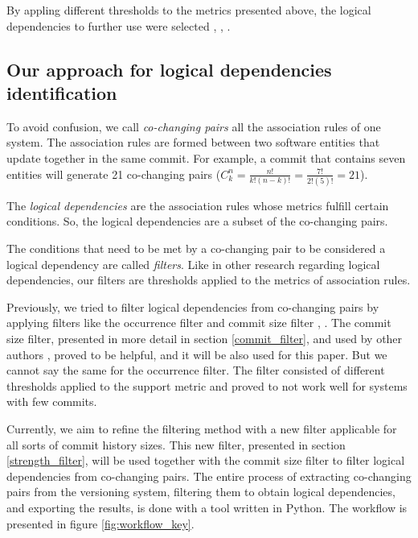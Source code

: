 \documentclass[runningheads]{comsis2}
\newcommand*{\Comb}[2]{{}C^{#1}_{#2}}%
\begin{document}
By appling different thresholds to the metrics presented above, the logical dependencies to further use were selected \cite{DBLP:conf/issre/OlivaG15}, \cite{DBLP:journals/jss/AjienkaC17}, \cite{Zimmermann:2004:MVH:998675.999460}.


\subsection{Our approach for logical dependencies identification}
\label{current_approach}

To avoid confusion, we call \textit{co-changing pairs} all the association rules of one system. The association rules are formed between two software entities that update together in the same commit.
For example, a commit that contains seven entities will generate 21 co-changing pairs ($\Comb{n}{k}=\frac{n!}{k!(n-k)!} = \frac{7!}{2!(5)!} = 21$).


The \textit{logical dependencies} are the association rules whose metrics fulfill certain conditions. So, the logical dependencies are a subset of the co-changing pairs. 

The conditions that need to be met by a co-changing pair to be considered a logical dependency are called \textit{filters}. Like in other research regarding logical dependencies, our filters are thresholds applied to the metrics of association rules. 

Previously, we tried to filter logical dependencies from co-changing pairs by applying filters like the occurrence filter and commit size filter \cite{saci19}, \cite{enase19}. 
The commit size filter, presented in more detail in section \ref{commit_filter}, and used by other authors \cite{DBLP:journals/jss/AjienkaC17}, proved to be helpful, and it will be also used for this paper. 
But we cannot say the same for the occurrence filter. The filter consisted of different thresholds applied to the support metric and proved to not work well for systems with few commits.

Currently, we aim to refine the filtering method with a new filter applicable for all sorts of commit history sizes. This new filter, presented in section \ref{strength_filter}, will be used together with the commit size filter to filter logical dependencies from co-changing pairs. The entire process of extracting co-changing pairs from the versioning system, filtering them to obtain logical dependencies, and exporting the results, is done with a tool written in Python. The workflow is presented in figure \ref{fig:workflow_key}.
\end{document}
